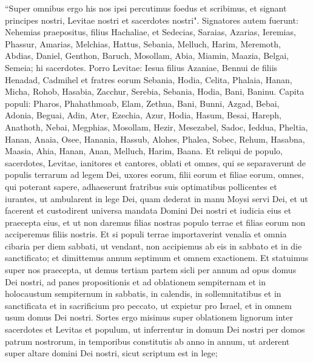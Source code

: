 \begin{biblechapter}  
\verse “Super omnibus ergo his nos ipsi percutimus foedus et scribimus, et signant principes nostri, Levitae nostri et sacerdotes nostri". 
\verse Signatores autem fuerunt: Nehemias praepositus, filius Hachaliae, et Sedecias, 
\verse Saraias, Azarias, Ieremias, 
\verse Phassur, Amarias, Melchias, 
\verse Hattus, Sebania, Melluch, 
\verse Harim, Meremoth, Abdias, 
\verse Daniel, Genthon, Baruch, 
\verse Mosollam, Abia, Miamin, 
\verse Maazia, Belgai, Semeia; hi sacerdotes. 
\verse Porro Levitae: Iesua filius Azaniae, Bennui de filiis Henadad, Cadmihel 
\verse et fratres eorum Sebania, Hodia, Celita, Phalaia, Hanan, 
\verse Micha, Rohob, Hasabia, 
\verse Zacchur, Serebia, Sebania, 
\verse Hodia, Bani, Baninu. 
\verse Capita populi: Pharos, Phahathmoab, Elam, Zethua, Bani, 
\verse Bunni, Azgad, Bebai, 
\verse Adonia, Beguai, Adin, 
\verse Ater, Ezechia, Azur, 
\verse Hodia, Hasum, Besai, 
\verse Hareph, Anathoth, Nebai, 
\verse Megphias, Mosollam, Hezir, 
\verse Mesezabel, Sadoc, Ieddua, 
\verse Pheltia, Hanan, Anaia, 
\verse Osee, Hanania, Hassub, 
\verse Alohes, Phalea, Sobec, 
\verse Rehum, Hasabna, Maasia, 
\verse Ahia, Hanan, Anan, 
\verse Melluch, Harim, Baana. 
\verse Et reliqui de populo, sacerdotes, Levitae, ianitores et cantores, oblati et omnes, qui se separaverunt de populis terrarum ad legem Dei, uxores eorum, filii eorum et filiae eorum, omnes, qui poterant sapere, 
\verse adhaeserunt fratribus suis optimatibus pollicentes et iurantes, ut ambularent in lege Dei, quam dederat in manu Moysi servi Dei, et ut facerent et custodirent universa mandata Domini Dei nostri et iudicia eius et praecepta eius, 
\verse et ut non daremus filias nostras populo terrae et filias eorum non acciperemus filiis nostris. 
\verse Et si populi terrae importaverint venalia et omnia cibaria per diem sabbati, ut vendant, non accipiemus ab eis in sabbato et in die sanctificato; et dimittemus annum septimum et omnem exactionem. 
\verse Et statuimus super nos praecepta, ut demus tertiam partem sicli per annum ad opus domus Dei nostri,  
\verse ad panes propositionis et ad oblationem sempiternam et in holocaustum sempiternum in sabbatis, in calendis, in sollemnitatibus et in sanctificata et in sacrificium pro peccato, ut expietur pro Israel, et in omnem usum domus Dei nostri. 
\verse Sortes ergo misimus super oblationem lignorum inter sacerdotes et Levitas et populum, ut inferrentur in domum Dei nostri per domos patrum nostrorum, in temporibus constitutis ab anno in annum, ut arderent super altare domini Dei nostri, sicut scriptum est in lege; 

\end{biblechapter}
